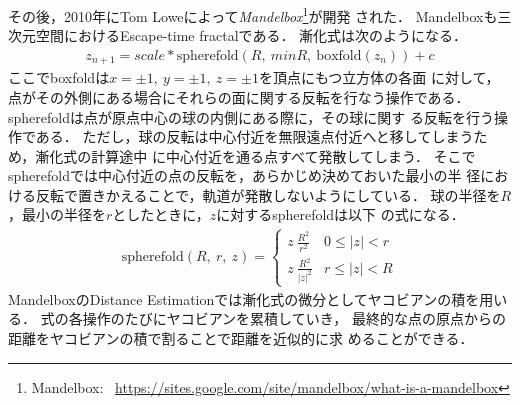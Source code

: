 その後，2010年にTom Loweによって\textit{Mandelbox}\footnote{Mandelbox:
~\url{https://sites.google.com/site/mandelbox/what-is-a-mandelbox}}が開発
された．
Mandelboxも三次元空間におけるEscape-time fractalである．
漸化式は次のようになる．
\begin{align*}
 z_{n+1} = scale * \text{spherefold}(R,~minR,~\text{boxfold}(z_n)) + c
\end{align*}
ここでboxfoldは$x=\pm1,~y=\pm1,~z=\pm1$を頂点にもつ立方体の各面
に対して，点がその外側にある場合にそれらの面に関する反転を行なう操作である．
spherefoldは点が原点中心の球の内側にある際に，その球に関す
る反転を行う操作である．
ただし，球の反転は中心付近を無限遠点付近へと移してしまうため，漸化式の計算途中
に中心付近を通る点すべて発散してしまう．
そこでspherefoldでは中心付近の点の反転を，あらかじめ決めておいた最小の半
径における反転で置きかえることで，軌道が発散しないようにしている．
球の半径を$R$，最小の半径を$r$としたときに，$z$に対するspherefoldは以下
の式になる．
\begin{align*}
 \text{spherefold}(R,~r,~z) = \begin{cases}
                               z~\frac{R^2}{r^2} & 0 \le |z| < r \\
                               z~\frac{R^2}{|z|^2} & r \le |z| < R
                              \end{cases}
\end{align*}
MandelboxのDistance Estimationでは漸化式の微分としてヤコビアンの積を用いる．
式の各操作のたびにヤコビアンを累積していき，
最終的な点の原点からの距離をヤコビアンの積で割ることで距離を近似的に求
めることができる．

